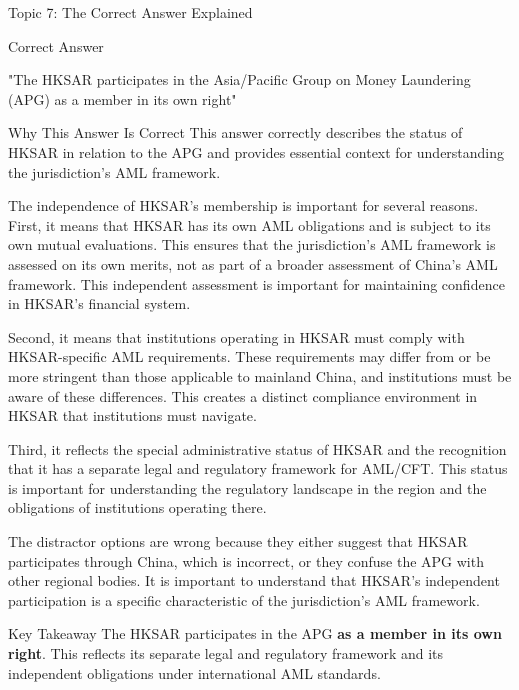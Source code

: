 \documentclass[8pt]{beamer}  %
\newcommand{\correct}{\textcolor{correctgreen}{\ding{51}}}
\begin{document}
	\begin{frame}{Topic 7: The Correct Answer Explained}
		\begin{block}{\large \correct \textcolor{correctgreen}{Correct Answer}}
			\begin{center}
				\Large "The HKSAR participates in the Asia/Pacific Group on Money Laundering (APG) as a member in its own right"
			\end{center}
		\end{block}
		
		\vspace{0.2cm}
		\begin{block}{\large Why This Answer Is Correct}
			This answer correctly describes the status of HKSAR in relation to the APG and provides essential context for understanding the jurisdiction's AML framework.
			
			The independence of HKSAR's membership is important for several reasons. First, it means that HKSAR has its own AML obligations and is subject to its own mutual evaluations. This ensures that the jurisdiction's AML framework is assessed on its own merits, not as part of a broader assessment of China's AML framework. This independent assessment is important for maintaining confidence in HKSAR's financial system.
			
			Second, it means that institutions operating in HKSAR must comply with HKSAR-specific AML requirements. These requirements may differ from or be more stringent than those applicable to mainland China, and institutions must be aware of these differences. This creates a distinct compliance environment in HKSAR that institutions must navigate.
			
			Third, it reflects the special administrative status of HKSAR and the recognition that it has a separate legal and regulatory framework for AML/CFT. This status is important for understanding the regulatory landscape in the region and the obligations of institutions operating there.
			
			The distractor options are wrong because they either suggest that HKSAR participates through China, which is incorrect, or they confuse the APG with other regional bodies. It is important to understand that HKSAR's independent participation is a specific characteristic of the jurisdiction's AML framework.
		\end{block}
		
		\begin{alertblock}{Key Takeaway}
			The HKSAR participates in the APG \textbf{as a member in its own right}. This reflects its separate legal and regulatory framework and its independent obligations under international AML standards.
		\end{alertblock}
	\end{frame}
	
\end{document}
